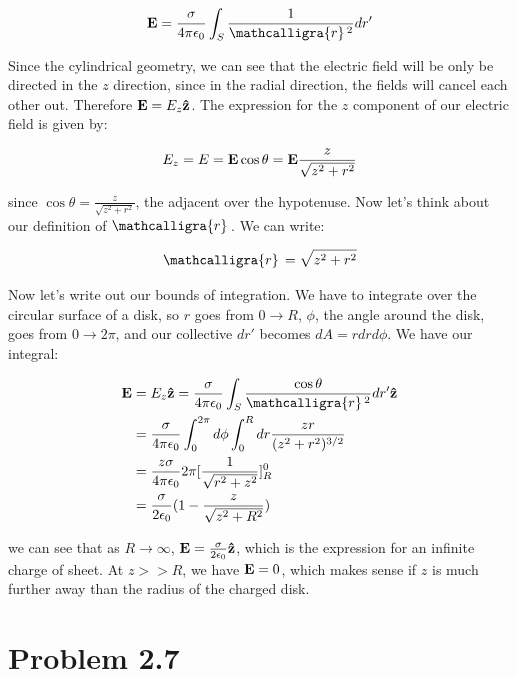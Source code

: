 \documentclass{article}
\newcommand{\scriptr}{\mathcalligra{r}\,}
\numberwithin{equation}{section}
\numberwithin{figure}{section}
\newcommand{\vbh}[1]{\vb{\hat{#1}}}
\begin{document}
\begin{equation}
    \vb{E} = \frac{\sigma}{4 \pi \epsilon_0} \int_S \frac{1}{\scriptr^2} dr'  
\end{equation}

Since the cylindrical geometry, we can see that the electric field will be only be directed in the $z$ direction, since in the radial direction, the fields will cancel each other out. Therefore $\vb{E} = E_z \vbh{z}$. The expression for the $z$ component of our electric field is given by:

\begin{equation}
    E_z = E= \vb{E} \cos \theta =  \vb{E} \frac{z}{ \sqrt{z^2 + r^2}}
\end{equation}

since $\cos \theta = \frac{z}{ \sqrt{z^2 + r^2}}$, the adjacent over the hypotenuse. Now let's think about our definition of $\scriptr$. We can write:

\begin{equation}
    \scriptr = \sqrt{z^2 + r^2}
\end{equation}

Now let's write out our bounds of integration. We have to integrate over the circular surface of a disk, so $r$ goes from $0 \to R$, $\phi$, the angle around the disk, goes from $0 \to 2\pi$, and our collective $dr'$ becomes $dA = r dr d\phi$. We have our integral:

\begin{equation}
\begin{split}
    \vb{E} &= E_z \vbh{z} = \frac{\sigma}{4 \pi \epsilon_0} \int_S \frac{\cos \theta}{\scriptr^2} dr' \vbh{z} \\
     &= \frac{\sigma}{4 \pi \epsilon_0} \int_0^{2\pi} d\phi \int_0^R dr \frac{zr}{(z^2+r^2)^{3/2}} \\
     &= \frac{z \sigma}{4 \pi \epsilon_0} 2 \pi \lbrack \frac{1}{\sqrt{r^2 + z^2}} \rbrack^{0}_{R} \\
     &= \frac{\sigma}{2 \epsilon_0} (1 - \frac{z}{\sqrt{z^2 + R^2}})
    \end{split}
\end{equation}

we can see that as $R \to \infty$, $\vb{E} = \frac{\sigma}{2 \epsilon_0} \vbh{z}$, which is the expression for an infinite charge of sheet. At $z >> R$, we have $\vb{E} = 0$, which makes sense if $z$ is much further away than the radius of the charged disk.

\section{Problem 2.7}
\end{document}
